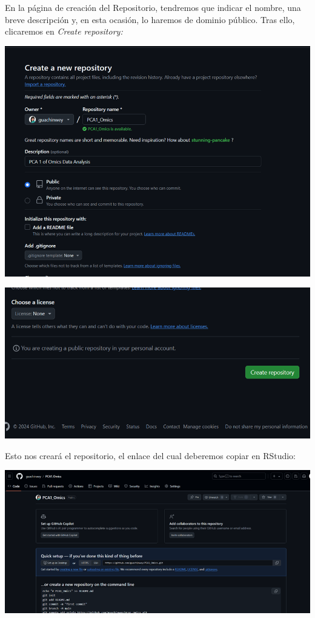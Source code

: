 \documentclass[
]{article}
\begin{document}
En la página de creación del Repositorio, tendremos que indicar el
nombre, una breve descripción y, en esta ocasión, lo haremos de dominio
público. Tras ello, clicaremos en \emph{Create repository:}

\includegraphics{images/clipboard-3557996507.png}

\includegraphics{images/clipboard-2127165342.png}

Esto nos creará el repositorio, el enlace del cual deberemos copiar en
RStudio:

\includegraphics{images/clipboard-3940631010.png}
\end{document}
